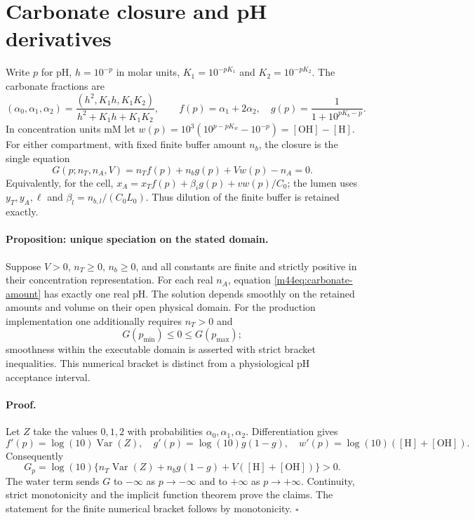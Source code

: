 \section{Carbonate closure and pH derivatives}
\label{m44sec:carbonate-proof}
Write $p$ for pH, $h=10^{-p}$ in molar units,
$K_1=10^{-pK_1}$ and $K_2=10^{-pK_2}$.  The carbonate fractions are
\[
 (\alpha_0,\alpha_1,\alpha_2)=
 \frac{(h^2,K_1h,K_1K_2)}{h^2+K_1h+K_1K_2},\qquad
 f(p)=\alpha_1+2\alpha_2,\quad
 g(p)=\frac1{1+10^{pK_b-p}}.
\]
In concentration units mM let
$w(p)=10^3(10^{p-pK_w}-10^{-p})=[\mathrm{OH}]-[\mathrm H]$.
For either compartment, with fixed finite buffer amount $n_b$, the closure
is the single equation
\begin{equation}
 G(p;n_T,n_A,V)=n_Tf(p)+n_bg(p)+Vw(p)-n_A=0.
 \label{m44eq:carbonate-amount}
\end{equation}
Equivalently, for the cell,
$x_A=x_Tf(p)+\beta_i g(p)+v w(p)/C_0$; the lumen uses $y_T,y_A,\ell$
and $\beta_l=n_{b,l}/(C_0L_0)$.  Thus dilution of the finite buffer is
retained exactly.

\paragraph{Proposition: unique speciation on the stated domain.}
Suppose $V>0$, $n_T\geq0$, $n_b\geq0$, and all constants are finite and
strictly positive in their concentration representation.  For each real
$n_A$, equation \eqref{m44eq:carbonate-amount} has exactly one real pH.
The solution depends smoothly on the retained amounts and volume on their
open physical domain.  For the production implementation one additionally
requires $n_T>0$ and
\[
 G(p_{\min})\leq0\leq G(p_{\max});
\]
smoothness within the executable domain is asserted with strict bracket
inequalities.  This numerical bracket is distinct from a physiological
pH acceptance interval.

\paragraph{Proof.}
Let $Z$ take the values $0,1,2$ with probabilities
$\alpha_0,\alpha_1,\alpha_2$.  Differentiation gives
\[
 f'(p)=\log(10)\operatorname{Var}(Z),\quad
 g'(p)=\log(10)g(1-g),\quad
 w'(p)=\log(10)([\mathrm H]+[\mathrm{OH}]).
\]
Consequently
\begin{equation}
 G_p=\log(10)\{n_T\operatorname{Var}(Z)+n_bg(1-g)
                  +V([\mathrm H]+[\mathrm{OH}])\}>0.
 \label{m44eq:carbonate-positive}
\end{equation}
The water term sends $G$ to $-\infty$ as $p\to-\infty$ and to
$+\infty$ as $p\to+\infty$.  Continuity, strict monotonicity and the
implicit function theorem prove the claims.  The statement for the
finite numerical bracket follows by monotonicity. $\square$

